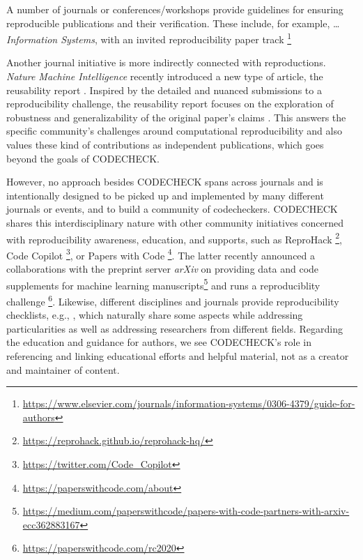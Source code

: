 \documentclass[12pt]{article}
\begin{document}

A number of journals or conferences/workshops provide guidelines for ensuring reproducible publications and their verification.
These include, for example, \ldots{}
\emph{Information Systems}, with an invited reproducibility paper track
\footnote{\url{https://www.elsevier.com/journals/information-systems/0306-4379/guide-for-authors}}

Another journal initiative is more indirectly connected with reproductions.
\emph{Nature Machine Intelligence} recently introduced a new type of article,
the reusability report \cite{noauthor_research_2020}.
Inspired by the detailed and nuanced submissions to a reproducibility 
challenge, the reusability report focuses on the exploration of robustness
and generalizability of the original paper's claims
\cite{noauthor_research_2020}. This answers the specific community's 
challenges around computational reproducibility and also values these kind
of contributions as independent publications, which goes beyond the goals 
of CODECHECK.

However, no approach besides CODECHECK spans across journals and is
intentionally designed to be picked up and implemented by many different 
journals or events, and to build a community of codecheckers. CODECHECK shares
this interdisciplinary nature with other community initiatives concerned with 
reproducibility awareness, education, and supports, such as ReproHack
\footnote{\url{https://reprohack.github.io/reprohack-hq/}}, Code Copilot
\footnote{\url{https://twitter.com/Code_Copilot}}, or Papers with Code
\footnote{\url{https://paperswithcode.com/about}}.
The latter recently announced a collaborations with the preprint server
\emph{arXiv} on providing data and code supplements for machine learning
manuscripts\footnote{\url{https://medium.com/paperswithcode/papers-with-code-partners-with-arxiv-ecc362883167}} and runs a reproduciblity challenge
\footnote{\url{https://paperswithcode.com/rc2020}}.
Likewise, different disciplines and journals provide reproducibility
checklists, e.g., \cite{rosenberg_next_2020}, which naturally share some
aspects while addressing particularities as well as addressing researchers
from different fields. Regarding the education and guidance for authors, 
we see CODECHECK's role in referencing and linking educational efforts
and helpful material, not as a creator and maintainer of content.
\end{document}
